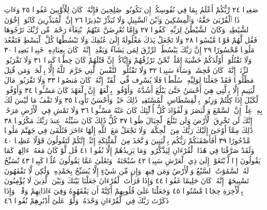 صَغِيرࣰا ٢٤ رَّبُّكُمْ أَعْلَمُ بِمَا فِي نُفُوسِكُمْۚ إِن تَكُونُوا۟ صَٰلِحِينَ
فَإِنَّهُۥ كَانَ لِلْأَوَّٰبِينَ غَفُورࣰا ٢٥ وَءَاتِ ذَا ٱلْقُرْبَىٰ حَقَّهُۥ
وَٱلْمِسْكِينَ وَٱبْنَ ٱلسَّبِيلِ وَلَا تُبَذِّرْ تَبْذِيرًا ٢٦ إِنَّ ٱلْمُبَذِّرِينَ
كَانُوٓا۟ إِخْوَٰنَ ٱلشَّيَٰطِينِۖ وَكَانَ ٱلشَّيْطَٰنُ لِرَبِّهِۦ كَفُورࣰا ٢٧
وَإِمَّا تُعْرِضَنَّ عَنْهُمُ ٱبْتِغَآءَ رَحْمَةࣲ مِّن رَّبِّكَ تَرْجُوهَا فَقُل لَّهُمْ قَوْلࣰا
مَّيْسُورࣰا ٢٨ وَلَا تَجْعَلْ يَدَكَ مَغْلُولَةً إِلَىٰ عُنُقِكَ وَلَا تَبْسُطْهَا
كُلَّ ٱلْبَسْطِ فَتَقْعُدَ مَلُومࣰا مَّحْسُورًا ٢٩ إِنَّ رَبَّكَ يَبْسُطُ ٱلرِّزْقَ
لِمَن يَشَآءُ وَيَقْدِرُۚ إِنَّهُۥ كَانَ بِعِبَادِهِۦ خَبِيرَۢا بَصِيرࣰا ٣٠ وَلَا تَقْتُلُوٓا۟
أَوْلَٰدَكُمْ خَشْيَةَ إِمْلَٰقࣲۖ نَّحْنُ نَرْزُقُهُمْ وَإِيَّاكُمْۚ إِنَّ قَتْلَهُمْ كَانَ
خِطْـࣰٔا كَبِيرࣰا ٣١ وَلَا تَقْرَبُوا۟ ٱلزِّنَىٰٓۖ إِنَّهُۥ كَانَ فَٰحِشَةࣰ وَسَآءَ
سَبِيلࣰا ٣٢ وَلَا تَقْتُلُوا۟ ٱلنَّفْسَ ٱلَّتِي حَرَّمَ ٱللَّهُ إِلَّا بِٱلْحَقِّۗ
وَمَن قُتِلَ مَظْلُومࣰا فَقَدْ جَعَلْنَا لِوَلِيِّهِۦ سُلْطَٰنࣰا فَلَا يُسْرِف فِّي
ٱلْقَتْلِۖ إِنَّهُۥ كَانَ مَنصُورࣰا ٣٣ وَلَا تَقْرَبُوا۟ مَالَ ٱلْيَتِيمِ إِلَّا بِٱلَّتِي
هِيَ أَحْسَنُ حَتَّىٰ يَبْلُغَ أَشُدَّهُۥۚ وَأَوْفُوا۟ بِٱلْعَهْدِۖ إِنَّ ٱلْعَهْدَ كَانَ
مَسْـُٔولࣰا ٣٤ وَأَوْفُوا۟ ٱلْكَيْلَ إِذَا كِلْتُمْ وَزِنُوا۟ بِٱلْقِسْطَاسِ ٱلْمُسْتَقِيمِۚ
ذَٰلِكَ خَيْرࣱ وَأَحْسَنُ تَأْوِيلࣰا ٣٥ وَلَا تَقْفُ مَا لَيْسَ لَكَ بِهِۦ عِلْمٌۚ إِنَّ
ٱلسَّمْعَ وَٱلْبَصَرَ وَٱلْفُؤَادَ كُلُّ أُو۟لَٰٓئِكَ كَانَ عَنْهُ مَسْـُٔولࣰا ٣٦
وَلَا تَمْشِ فِي ٱلْأَرْضِ مَرَحًاۖ إِنَّكَ لَن تَخْرِقَ ٱلْأَرْضَ وَلَن تَبْلُغَ
ٱلْجِبَالَ طُولࣰا ٣٧ كُلُّ ذَٰلِكَ كَانَ سَيِّئُهُۥ عِندَ رَبِّكَ مَكْرُوهࣰا ٣٨
ذَٰلِكَ مِمَّآ أَوْحَىٰٓ إِلَيْكَ رَبُّكَ مِنَ ٱلْحِكْمَةِۗ وَلَا تَجْعَلْ مَعَ ٱللَّهِ إِلَٰهًا
ءَاخَرَ فَتُلْقَىٰ فِي جَهَنَّمَ مَلُومࣰا مَّدْحُورًا ٣٩ أَفَأَصْفَىٰكُمْ رَبُّكُم
بِٱلْبَنِينَ وَٱتَّخَذَ مِنَ ٱلْمَلَٰٓئِكَةِ إِنَٰثًاۚ إِنَّكُمْ لَتَقُولُونَ قَوْلًا عَظِيمࣰا ٤٠
وَلَقَدْ صَرَّفْنَا فِي هَٰذَا ٱلْقُرْءَانِ لِيَذَّكَّرُوا۟ وَمَا يَزِيدُهُمْ إِلَّا نُفُورࣰا ٤١
قُل لَّوْ كَانَ مَعَهُۥٓ ءَالِهَةࣱ كَمَا يَقُولُونَ إِذࣰا لَّٱبْتَغَوْا۟ إِلَىٰ ذِي ٱلْعَرْشِ سَبِيلࣰا ٤٢
سُبْحَٰنَهُۥ وَتَعَٰلَىٰ عَمَّا يَقُولُونَ عُلُوࣰّا كَبِيرࣰا ٤٣ تُسَبِّحُ لَهُ ٱلسَّمَٰوَٰتُ
ٱلسَّبْعُ وَٱلْأَرْضُ وَمَن فِيهِنَّۚ وَإِن مِّن شَيْءٍ إِلَّا يُسَبِّحُ بِحَمْدِهِۦ وَلَٰكِن
لَّا تَفْقَهُونَ تَسْبِيحَهُمْۚ إِنَّهُۥ كَانَ حَلِيمًا غَفُورࣰا ٤٤ وَإِذَا قَرَأْتَ
ٱلْقُرْءَانَ جَعَلْنَا بَيْنَكَ وَبَيْنَ ٱلَّذِينَ لَا يُؤْمِنُونَ بِٱلْأٓخِرَةِ حِجَابࣰا
مَّسْتُورࣰا ٤٥ وَجَعَلْنَا عَلَىٰ قُلُوبِهِمْ أَكِنَّةً أَن يَفْقَهُوهُ وَفِيٓ ءَاذَانِهِمْ
وَقْرࣰاۚ وَإِذَا ذَكَرْتَ رَبَّكَ فِي ٱلْقُرْءَانِ وَحْدَهُۥ وَلَّوْا۟ عَلَىٰٓ أَدْبَٰرِهِمْ نُفُورࣰا ٤٦
